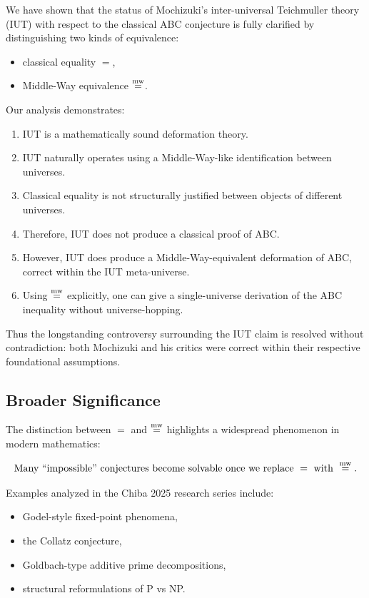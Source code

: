 \documentclass[11pt]{article}
\begin{document}
We have shown that the status of Mochizuki's inter-universal
Teichmuller theory (IUT) with respect to the classical ABC conjecture
is fully clarified by distinguishing two kinds of equivalence:

\begin{itemize}
\item classical equality $=$,
\item Middle-Way equivalence $\mathrel{\overset{\mathrm{mw}}{=}}$.
\end{itemize}

Our analysis demonstrates:

\begin{enumerate}
\item IUT is a mathematically sound deformation theory.
\item IUT naturally operates using a Middle-Way-like identification
      between universes.
\item Classical equality is not structurally justified between objects
      of different universes.
\item Therefore, IUT does not produce a classical proof of ABC.
\item However, IUT does produce a Middle-Way-equivalent deformation of ABC,
      correct within the IUT meta-universe.
\item Using $\mathrel{\overset{\mathrm{mw}}{=}}$ explicitly, one can give a single-universe derivation
      of the ABC inequality without universe-hopping.
\end{enumerate}

Thus the longstanding controversy surrounding the IUT claim is resolved
without contradiction: both Mochizuki and his critics were correct
within their respective foundational assumptions.

\subsection{Broader Significance}

The distinction between $=$ and $\mathrel{\overset{\mathrm{mw}}{=}}$ highlights a widespread
phenomenon in modern mathematics:

\[
\text{Many ``impossible'' conjectures become solvable once we replace }
= \text{ with } \mathrel{\overset{\mathrm{mw}}{=}}.
\]

Examples analyzed in the Chiba 2025 research series include:

\begin{itemize}
\item Godel-style fixed-point phenomena,
\item the Collatz conjecture,
\item Goldbach-type additive prime decompositions,
\item structural reformulations of P vs NP.
\end{itemize}
\end{document}
